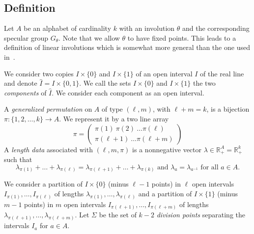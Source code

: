\documentclass[preprint,12pt]{elsarticle}
\newcommand{\R}{\mathbb{R}}
\numberwithin{theorem}{section}
\numberwithin{equation}{section}
\numberwithin{figure}{section}
\numberwithin{table}{section}
\begin{document}
\subsection{Definition}
Let $A$ be an alphabet of cardinality $k$ with an involution $\theta$ and the corresponding specular group $G_\theta$. 
Note that we allow
$\theta$ to have fixed points. 
This leads to a definition of linear involutions which is somewhat more general than the one used in~\cite{DanthonyNogueira1988,BertheDelecroixDolcePerrinReutenauerRindone2014}.


We consider two copies $I\times \{0\}$ and
$I\times \{1\}$ of an open interval $I$ of the real line and denote  $\hat{I}=I\times \{0,1\}$.
We call the sets $I\times \{0\}$ and $I\times \{1\}$ the two
\emph{components} of $\hat{I}$. We consider each component as an open interval.


A \emph{generalized permutation} on $A$ of type $(\ell,m)$, with $\ell+m=k$,
  is a bijection $\pi:\{1,2,\ldots,k\}\rightarrow A$.
We represent it by a two line array
\begin{displaymath}
\pi=\begin{pmatrix} \pi(1)\ \pi(2)\ \ldots \pi(\ell)\\
\pi(\ell +1)\ \ldots \pi(\ell+m)
\end{pmatrix}
\end{displaymath}
A \emph{length data} associated with $(\ell,m,\pi)$ is a nonnegative
vector $\lambda\in \R_+^{A}=\R_+^{k}$ such that
\begin{displaymath}
\lambda_{\pi(1)}+\ldots+\lambda_{\pi(\ell)}=
\lambda_{\pi(\ell+1)}+\ldots+\lambda_{\pi(k)}
\text{ and }\lambda_a=\lambda_{a^{-1}}\text{ for all }a\in A.
\end{displaymath}

We consider a partition of $I\times \{0\}$ (minus $\ell-1$
points) in $\ell$ open intervals
$I_{\pi(1)},\ldots,I_{\pi(\ell)}$ of lengths $\lambda_{\pi(1)},\ldots,\lambda_{\pi(\ell)}$
and a partition of $I\times \{1\}$ (minus $m-1$ points) in $m$ open intervals
$I_{\pi(\ell+1)},\ldots,I_{\pi(\ell+m)}$ of lengths $\lambda_{\pi(\ell+1)},\ldots,\lambda_{\pi(\ell+m)}$. Let $\Sigma$ be the set of $k-2$ \emph{division points} separating
the intervals $I_a$ for $a\in A$.
\end{document}
